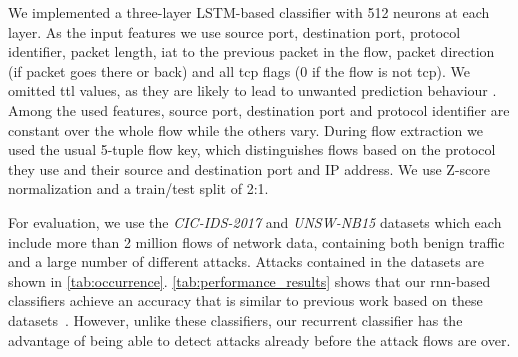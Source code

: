 \documentclass[conference]{IEEEtran}
\begin{document}
We implemented a three-layer LSTM-based classifier with 512 neurons at each layer. As the input features we use
source port, destination port, protocol identifier, packet length, \gls{iat} to the previous packet in the flow, packet direction (if packet goes there or back) and all \gls{tcp} flags (0 if the flow is not \gls{tcp}).
We omitted \gls{ttl} values, as they are likely to lead to unwanted prediction behaviour \cite{bachl_walling_2019}.  Among the used features, source port, destination port and protocol identifier are constant over the whole flow while the others vary.
During flow extraction we used the usual 5-tuple flow key, which distinguishes flows based on the protocol they use and their source and destination port and IP address.
We use Z-score normalization and a train/test split of 2:1.

For evaluation, we use the \textit{CIC-IDS-2017} \cite{sharafaldin_toward_2018} and \textit{UNSW-NB15} \cite{moustafa_unsw-nb15:_2015} datasets which each include more than 2 million flows of network data, containing both benign traffic and a large number of different attacks. Attacks contained in the datasets are shown in \autoref{tab:occurrence}.
\autoref{tab:performance_results} shows that our \gls{rnn}-based classifiers achieve an accuracy that is similar to previous work based on these datasets~\cite{meghdouri_analysis_2018,bachl_walling_2019}. However, unlike these classifiers, our recurrent classifier has the advantage of being able to detect attacks already before the attack flows are over.
\end{document}
